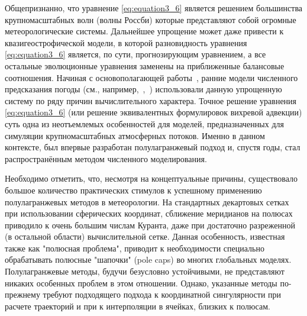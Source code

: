 Общепризнанно, что уравнение \eqref{eq:equation3_6} является решением большинства крупномасштабных волн (волны Россби) которые представляют собой огромные метеорологические системы. Дальнейшее упрощение может даже привести к квазигеострофической модели, в которой разновидность уравнения \eqref{eq:equation3_6} является, по сути, прогнозирующим уравнением, а все остальные эволюционные уравнения заменены на приближенные балансовые соотношения. Начиная с основополагающей работы~\cite{A8}, ранние модели численного предсказания погоды (см., например,~\cite{A24},~\cite{A73}) использовали данную упрощенную систему по ряду причин вычислительного характера. Точное решение уравнения \eqref{eq:equation3_6} (или решение эквивалентных формулировок вихревой адвекции) суть одна из неотъемлемых особенностей для моделей, предназначенных для симуляции крупномасштабных атмосферных потоков. Именно в данном контексте, был впервые разработан полулагранжевый подход и, спустя годы, стал распространённым методом численного моделирования.

Необходимо отметить, что, несмотря на концептуальные причины, существовало большое количество практических стимулов к успешному применению полулагранжевых методов в метеорологии. На стандартных декартовых сетках при использовании сферических координат, сближение меридианов на полюсах приводило к очень большим числам Куранта, даже при достаточно разреженной (в остальной области) вычислительной сетке. Данная особенность, известная также как "полюсная проблема", приводит к необходимости специально обрабатывать полюсные "шапочки" (pole caps) во многих глобальных моделях. Полулагранжевые методы, будучи безусловно устойчивыми, не представляют никаких особенных проблем в этом отношении. Однако, указанные методы по-прежнему требуют подходящего подхода к координатной сингулярности при расчете траекторий и при к интерполяции в ячейках, близких к полюсам.
